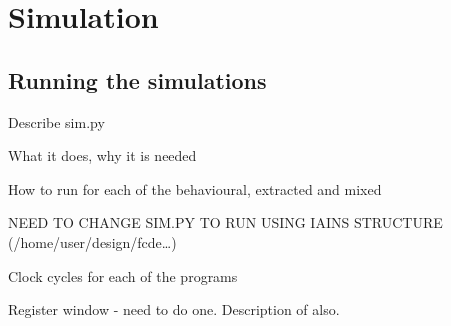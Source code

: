 
\section{Simulation}

\subsection{Running the simulations}

Describe sim.py

What it does, why it is needed

How to run for each of the behavioural, extracted and mixed

NEED TO CHANGE SIM.PY TO RUN USING IAINS STRUCTURE (/home/user/design/fcde\dots)

Clock cycles for each of the programs

Register window - need to do one. 
Description of also.




